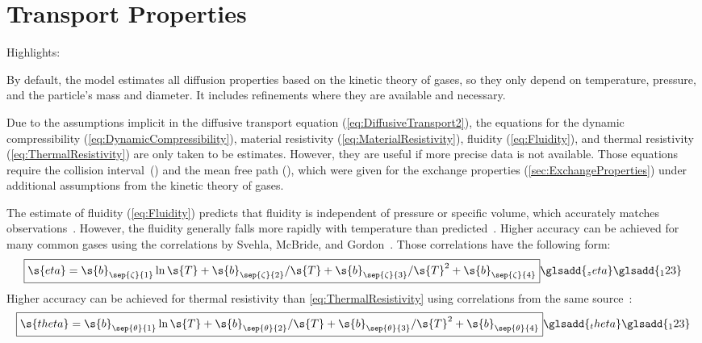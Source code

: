 \section{Transport Properties}
\label{sec:TransportProperties}

\begin{contextbox}
  Highlights:
  \begin{itemize*}
    \item By default, the model estimates all diffusion properties based on the kinetic theory of gases, so they only depend on temperature, pressure, and the particle's mass and diameter.  It includes refinements where they are available and necessary.
  \end{itemize*}
\end{contextbox}

Due to the assumptions implicit in the diffusive transport equation (\ref{eq:DiffusiveTransport2}), the equations for the dynamic compressibility (\ref{eq:DynamicCompressibility}), material resistivity (\ref{eq:MaterialResistivity}), fluidity (\ref{eq:Fluidity}), and thermal resistivity (\ref{eq:ThermalResistivity}) are only taken to be estimates.  However, they are useful if more precise data is not available.  Those equations require the collision interval~() and the mean free path (), which were given for the exchange properties (\autoref{sec:ExchangeProperties}) under additional assumptions from the kinetic theory of gases.

The estimate of fluidity (\autoref{eq:Fluidity}) predicts that fluidity is independent of pressure or specific volume, which accurately matches observations~\cite{Present1958}.  However, the fluidity generally falls more rapidly with temperature than predicted~\cite{Present1958}.  Higher accuracy can be achieved for many common gases using the correlations by Svehla, McBride, and Gordon~\cite{Svehla1995, McBride1996}.  Those correlations have the following form:
\begin{equation}
  \boxed{\s{eta} = \s{b}_{\sep{\zeta}{1}}\ln{\s{T}} + \s{b}_{\sep{\zeta}{2}}/\s{T} + \s{b}_{\sep{\zeta}{3}}/\s{T}^2 + \s{b}_{\sep{\zeta}{4}}}%
  \glsadd{_zeta}\glsadd{_123}
\end{equation}
Higher accuracy can be achieved for thermal resistivity than \autoref{eq:ThermalResistivity} using correlations from the same source~\cite{Svehla1995, McBride1996}:
\begin{equation}
  \boxed{\s{theta} = \s{b}_{\sep{\theta}{1}}\ln{\s{T}} + \s{b}_{\sep{\theta}{2}}/\s{T} + \s{b}_{\sep{\theta}{3}}/\s{T}^2 + \s{b}_{\sep{\theta}{4}}}%
  \glsadd{_theta}\glsadd{_123}
\end{equation}


